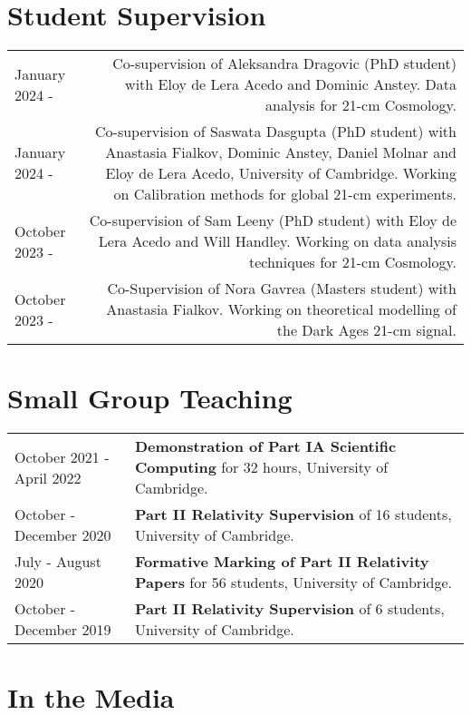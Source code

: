 \documentclass{article}
\begin{document}
\section*{Student Supervision}

\begin{tabular}{L!{\vrule}R}
    January 2024 - & Co-supervision of Aleksandra Dragovic (PhD student) with Eloy de Lera Acedo and Dominic Anstey. Data analysis for 21-cm Cosmology. \\
    January 2024 - & Co-supervision of Saswata Dasgupta (PhD student) with Anastasia Fialkov, Dominic Anstey, Daniel Molnar and Eloy de Lera Acedo, University of Cambridge. Working on Calibration methods for global 21-cm experiments. \\
	October 2023 - & Co-supervision of Sam Leeny (PhD student) with Eloy de Lera Acedo and Will Handley. Working on data analysis techniques for 21-cm Cosmology. \\
	October 2023 - & Co-Supervision of Nora Gavrea (Masters student) with Anastasia Fialkov. Working on theoretical modelling of the Dark Ages 21-cm signal. \\
\end{tabular}

\section*{Small Group Teaching}

\begin{tabular}{>{\raggedleft}p{}!{\vrule}p{0.76\textwidth}}
	October 2021 - April 2022 & \textbf{Demonstration of Part IA Scientific Computing} for 32 hours, University of Cambridge.\\
	October - December 2020 & \textbf{Part II Relativity Supervision} of 16 students,  University of Cambridge. \\
	July - August 2020 & \textbf{Formative Marking of Part II Relativity Papers} for 56 students, University of Cambridge. \\
	October - December 2019 & \textbf{Part II Relativity Supervision} of 6 students, University of Cambridge.
\end{tabular}

\section*{In the Media}
\end{document}

